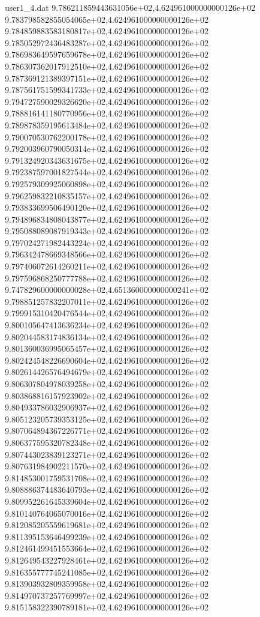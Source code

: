 \begin{filecontents}{user1_4.dat}
9.786211859443631056e+02,4.624961000000000126e+02
9.783798582855054065e+02,4.624961000000000126e+02
9.784859883583180817e+02,4.624961000000000126e+02
9.785052972436483287e+02,4.624961000000000126e+02
9.786983649597659678e+02,4.624961000000000126e+02
9.786307362017912510e+02,4.624961000000000126e+02
9.787369121389397151e+02,4.624961000000000126e+02
9.787561751599341733e+02,4.624961000000000126e+02
9.794727590029326620e+02,4.624961000000000126e+02
9.788816141180770956e+02,4.624961000000000126e+02
9.789878359195613484e+02,4.624961000000000126e+02
9.790070530762200178e+02,4.624961000000000126e+02
9.792003960790050314e+02,4.624961000000000126e+02
9.791324920343631675e+02,4.624961000000000126e+02
9.792387597001827544e+02,4.624961000000000126e+02
9.792579309925060898e+02,4.624961000000000126e+02
9.796259832210835157e+02,4.624961000000000126e+02
9.793833699506490120e+02,4.624961000000000126e+02
9.794896834808043877e+02,4.624961000000000126e+02
9.795088089087919343e+02,4.624961000000000126e+02
9.797024271982443224e+02,4.624961000000000126e+02
9.796342478669348566e+02,4.624961000000000126e+02
9.797406072614260211e+02,4.624961000000000126e+02
9.797596868250777788e+02,4.624961000000000126e+02
9.747829600000000028e+02,4.651360000000000241e+02
9.798851257832207011e+02,4.624961000000000126e+02
9.799915310420476544e+02,4.624961000000000126e+02
9.800105647413636234e+02,4.624961000000000126e+02
9.802044583174836134e+02,4.624961000000000126e+02
9.801360036995065457e+02,4.624961000000000126e+02
9.802424548226690604e+02,4.624961000000000126e+02
9.802614426576494679e+02,4.624961000000000126e+02
9.806307804978039258e+02,4.624961000000000126e+02
9.803868816157923902e+02,4.624961000000000126e+02
9.804933786032906937e+02,4.624961000000000126e+02
9.805123205739353125e+02,4.624961000000000126e+02
9.807064894367226771e+02,4.624961000000000126e+02
9.806377595320782348e+02,4.624961000000000126e+02
9.807443023839123271e+02,4.624961000000000126e+02
9.807631984902211570e+02,4.624961000000000126e+02
9.814853001759531708e+02,4.624961000000000126e+02
9.808886374483640793e+02,4.624961000000000126e+02
9.809952261645339604e+02,4.624961000000000126e+02
9.810140764065070016e+02,4.624961000000000126e+02
9.812085205559619681e+02,4.624961000000000126e+02
9.811395153646499239e+02,4.624961000000000126e+02
9.812461499451553664e+02,4.624961000000000126e+02
9.812649543227928461e+02,4.624961000000000126e+02
9.816355777745241085e+02,4.624961000000000126e+02
9.813903932809359958e+02,4.624961000000000126e+02
9.814970737257769997e+02,4.624961000000000126e+02
9.815158322390789181e+02,4.624961000000000126e+02

\end{filecontents}
